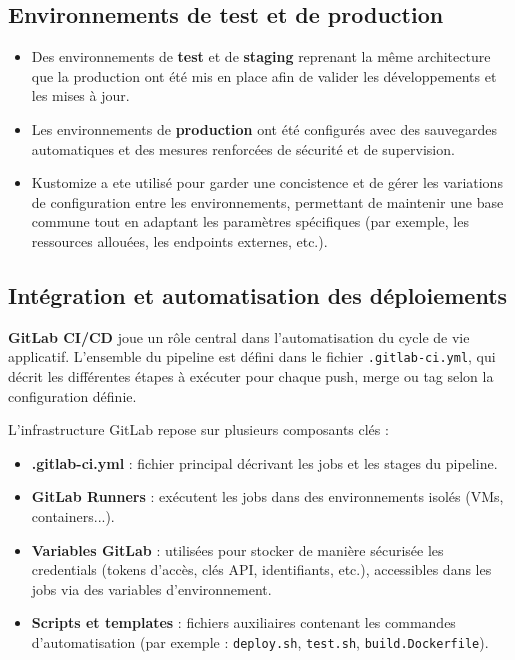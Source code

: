 \subsection{Environnements de test et de production}

\begin{itemize}
	\item Des environnements de \textbf{test} et de \textbf{staging} reprenant la même architecture que la production ont été mis en place afin de valider les développements et les mises à jour.
	\item Les environnements de \textbf{production} ont été configurés avec des sauvegardes automatiques et des mesures renforcées de sécurité et de supervision.
	\item Kustomize a ete utilisé pour garder une concistence et de gérer les variations de configuration entre les environnements, permettant de maintenir une base commune tout en adaptant les paramètres spécifiques (par exemple, les ressources allouées, les endpoints externes, etc.).
\end{itemize}

\subsection{Intégration et automatisation des déploiements}

\textbf{GitLab CI/CD} joue un rôle central dans l'automatisation du cycle de vie applicatif. L’ensemble du pipeline est défini dans le fichier \texttt{.gitlab-ci.yml}, qui décrit les différentes étapes à exécuter pour chaque push, merge ou tag selon la configuration définie.

L’infrastructure GitLab repose sur plusieurs composants clés :
\begin{itemize}
	\item \textbf{.gitlab-ci.yml} : fichier principal décrivant les jobs et les stages du pipeline.
	\item \textbf{GitLab Runners} : exécutent les jobs dans des environnements isolés (VMs, containers...).
	\item \textbf{Variables GitLab} : utilisées pour stocker de manière sécurisée les credentials (tokens d’accès, clés API, identifiants, etc.), accessibles dans les jobs via des variables d’environnement.
	\item \textbf{Scripts et templates} : fichiers auxiliaires contenant les commandes d’automatisation (par exemple : \texttt{deploy.sh}, \texttt{test.sh}, \texttt{build.Dockerfile}).
\end{itemize}

